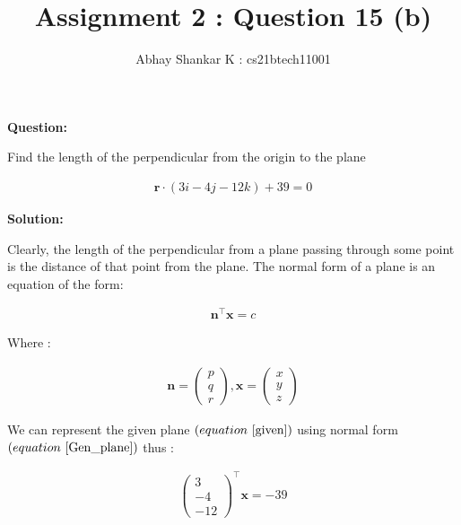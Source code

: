 \documentclass[journal,12pt,twocolumn]{IEEEtran}
\begin{document}
	\title{Assignment 2 : Question 15 (b)}
	\author{ Abhay Shankar K : cs21btech11001}

	\maketitle

	\bigskip

	\providecommand{\brak}[1]{\ensuremath{\left(#1\right)}}
	\providecommand{\abs}[1]{\left\vert#1\right\vert}
	\providecommand{\norm}[1]{\left\lVert#1\right\rVert}
	\newcommand{\solution}{\noindent \textbf{Solution: }}
	\newcommand{\question}{\noindent \textbf{Question: }}

	\newcommand{\myvec}[1]{\ensuremath{\begin{pmatrix}#1\end{pmatrix}}}
	\let\vec\mathbf


	\question


	Find the length of the perpendicular from the origin to the plane
	
	\begin{align} 
		\vec{r} \cdot \brak{3i - 4j - 12k} + 39 = 0
			\label{given}
	\end{align}


	\solution
	
	
	Clearly, the length of the perpendicular from a plane passing through some point is the distance of that point from the plane.
	The normal form of a plane is an equation of the form:
	
	\begin{align}
		\vec{n}^\top \vec{x} = c
			\label{Gen_plane}
	\end{align}


	Where :
	
	\begin{align}
		\vec{n} = \myvec{p \\ q \\ r}, 
		\vec{x} = \myvec{x \\ y \\ z}
	\end{align}


	We can represent the given plane \brak{equation ~\eqref{given}} using normal form \brak{equation ~\eqref{Gen_plane}} thus :
	
	\begin{align}
		\myvec{3 \\ -4 \\ -12}^\top \vec{\vec{x}} = -39
			\label{pln_nrm}
	\end{align}
	
\end{document}

